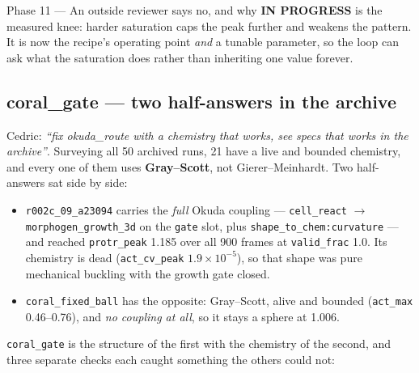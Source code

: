 \documentclass[11pt,a4paper]{article}
\newcommand{\code}[1]{\texttt{#1}}
\newcommand{\prog}{\textcolor{warn}{\textbf{IN PROGRESS}}}
\begin{document}
\begin{phasebox}{Phase 11 --- An outside reviewer says no, and why \hfill \prog}
 is the measured knee: harder saturation caps the peak further and weakens the
pattern. It is now the recipe's operating point \emph{and} a tunable parameter, so the loop can
ask what the saturation does rather than inheriting one value forever.

\subsection*{coral\_gate --- two half-answers in the archive}
Cedric: \emph{``fix okuda\_route with a chemistry that works, see specs that works in the
archive''}. Surveying all 50 archived runs, 21 have a live and bounded chemistry, and every one of
them uses \textbf{Gray--Scott}, not Gierer--Meinhardt. Two half-answers sat side by side:

\begin{itemize}\itemsep2pt
\item \code{r002c\_09\_a23094} carries the \emph{full} Okuda coupling --- \code{cell\_react} $\to$
      \code{morphogen\_growth\_3d} on the \code{gate} slot, plus \code{shape\_to\_chem:curvature}
      --- and reached \code{protr\_peak} 1.185 over all 900 frames at \code{valid\_frac} 1.0. Its
      chemistry is dead (\code{act\_cv\_peak} $1.9\times10^{-5}$), so that shape was pure
      mechanical buckling with the growth gate closed.
\item \code{coral\_fixed\_ball} has the opposite: Gray--Scott, alive and bounded
      (\code{act\_max} 0.46--0.76), and \emph{no coupling at all}, so it stays a sphere at 1.006.
\end{itemize}

\noindent \code{coral\_gate} is the structure of the first with the chemistry of the second, and
three separate checks each caught something the others could not:


\end{phasebox}
\end{document}
